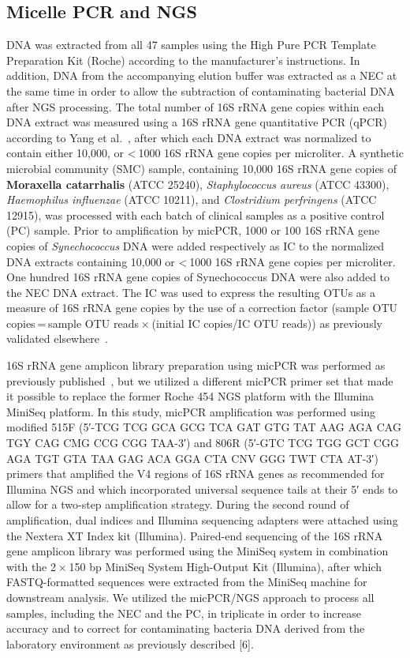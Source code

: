 \subsection*{Micelle PCR and NGS}

DNA was extracted from all 47 samples using the High Pure PCR Template Preparation Kit (Roche) according to the manufacturer’s instructions.
In addition, DNA from the accompanying elution buffer was extracted as a NEC at the same time in order to allow the subtraction of contaminating
bacterial DNA after NGS processing. The total number of 16S rRNA gene copies within each DNA extract was measured using a 16S rRNA gene
quantitative PCR (qPCR) according to Yang et al.~\cite{yang2002quantitative}, after which each DNA extract was normalized to contain either 10,000, or < 1000 16S rRNA
gene copies per microliter. A synthetic microbial community (SMC) sample, containing 10,000 16S rRNA gene copies of \textbf{Moraxella catarrhalis} (ATCC 25240),
\textit{Staphylococcus aureus} (ATCC 43300), \textit{Haemophilus influenzae} (ATCC 10211), and \textit{Clostridium perfringens} (ATCC 12915), was processed with each batch
of clinical samples as a positive control (PC) sample. Prior to amplification by micPCR, 1000 or 100 16S rRNA gene copies of \textit{Synechococcus} DNA
were added respectively as IC to the normalized DNA extracts containing 10,000 or < 1000 16S rRNA gene copies per microliter. One hundred 16S
rRNA gene copies of Synechococcus DNA were also added to the NEC DNA extract. The IC was used to express the resulting OTUs as a measure of
16S rRNA gene copies by the use of a correction factor (sample OTU copies = sample OTU reads × (initial IC copies/IC OTU reads)) as previously
validated elsewhere~\cite{boers2017novel}.

16S rRNA gene amplicon library preparation using micPCR was performed as previously published~\cite{boers2017novel}, but we utilized a different micPCR primer
set that made it possible to replace the former Roche 454 NGS platform with the Illumina MiniSeq platform. In this study, micPCR amplification
was performed using modified 515F (5′-TCG TCG GCA GCG TCA GAT GTG TAT AAG AGA CAG TGY CAG CMG CCG CGG TAA-3′) and 806R
(5′-GTC TCG TGG GCT CGG AGA TGT GTA TAA GAG ACA GGA CTA CNV GGG TWT CTA AT-3′) primers that amplified the V4 regions of 16S rRNA genes
as recommended for Illumina NGS and which incorporated universal sequence tails at their 5′ ends to allow for a two-step amplification
strategy. During the second round of amplification, dual indices and Illumina sequencing adapters were attached using the Nextera XT
Index kit (Illumina). Paired-end sequencing of the 16S rRNA gene amplicon library was performed using the MiniSeq system in combination
with the 2 × 150 bp MiniSeq System High-Output Kit (Illumina), after which FASTQ-formatted sequences were extracted from the MiniSeq
machine for downstream analysis. We utilized the micPCR/NGS approach to process all samples, including the NEC and the PC, in triplicate
in order to increase accuracy and to correct for contaminating bacteria DNA derived from the laboratory environment as previously described [6].

